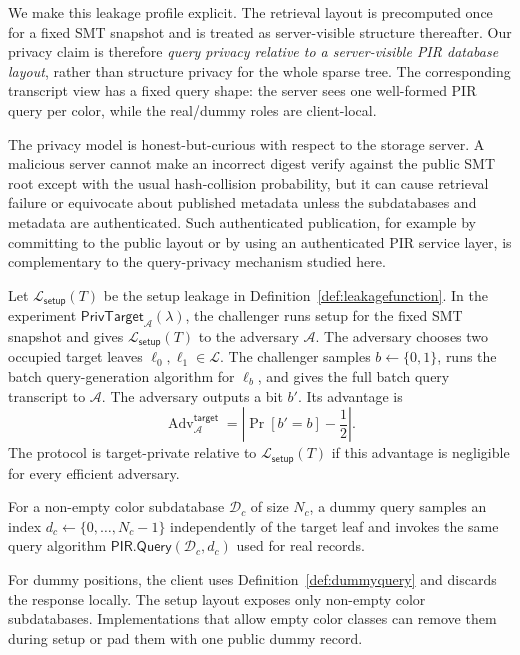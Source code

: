 We make this leakage profile explicit. The retrieval layout is precomputed once for a fixed SMT snapshot and is treated as server-visible structure thereafter. Our privacy claim is therefore \emph{query privacy relative to a server-visible PIR database layout}, rather than structure privacy for the whole sparse tree. The corresponding transcript view has a fixed query shape: the server sees one well-formed PIR query per color, while the real/dummy roles are client-local.

The privacy model is honest-but-curious with respect to the storage server. A malicious server cannot make an incorrect digest verify against the public SMT root except with the usual hash-collision probability, but it can cause retrieval failure or equivocate about published metadata unless the subdatabases and metadata are authenticated. Such authenticated publication, for example by committing to the public layout or by using an authenticated PIR service layer, is complementary to the query-privacy mechanism studied here.

\begin{definition}
\label{def:privacygame}
Let $\mathcal{L}_{\mathsf{setup}}(T)$ be the setup leakage in Definition~\ref{def:leakagefunction}. In the experiment $\mathsf{PrivTarget}_{\mathcal{A}}(\lambda)$, the challenger runs setup for the fixed SMT snapshot and gives $\mathcal{L}_{\mathsf{setup}}(T)$ to the adversary $\mathcal{A}$. The adversary chooses two occupied target leaves $\ell_0,\ell_1\in\mathcal{L}$. The challenger samples $b\leftarrow\{0,1\}$, runs the batch query-generation algorithm for $\ell_b$, and gives the full batch query transcript to $\mathcal{A}$. The adversary outputs a bit $b'$. Its advantage is
\[
\operatorname{Adv}^{\mathsf{target}}_{\mathcal{A}}
=\left|\Pr[b'=b]-\frac12\right|.
\]
The protocol is target-private relative to $\mathcal{L}_{\mathsf{setup}}(T)$ if this advantage is negligible for every efficient adversary.
\end{definition}

\begin{definition}
\label{def:dummyquery}
For a non-empty color subdatabase $\mathcal{D}_c$ of size $N_c$, a dummy query samples an index $d_c\leftarrow \{0,\ldots,N_c-1\}$ independently of the target leaf and invokes the same query algorithm $\mathsf{PIR.Query}(\mathcal{D}_c,d_c)$ used for real records.
\end{definition}

For dummy positions, the client uses Definition~\ref{def:dummyquery} and discards the response locally. The setup layout exposes only non-empty color subdatabases. Implementations that allow empty color classes can remove them during setup or pad them with one public dummy record.

